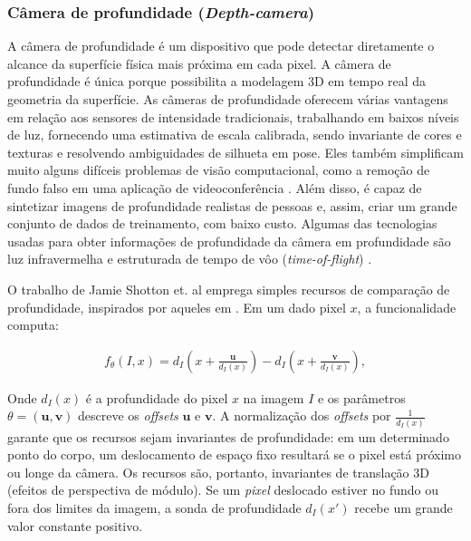  \subsubsection{Câmera de profundidade (\textit{Depth-camera})}\label{sec:depth}
A câmera de profundidade é um dispositivo que pode detectar diretamente o alcance da superfície física mais próxima em cada pixel. A câmera de profundidade é única porque possibilita a modelagem 3D em tempo real da geometria da superfície. As câmeras de profundidade oferecem várias vantagens em relação aos sensores de intensidade tradicionais, trabalhando em baixos níveis de luz, fornecendo uma estimativa de escala calibrada, sendo invariante de cores e texturas e resolvendo ambiguidades de silhueta em pose. Eles também simplificam muito alguns difíceis problemas de visão computacional, como a remoção de fundo falso em uma aplicação de videoconferência \cite{wilson2010combining}. Além disso, é capaz de sintetizar imagens de profundidade realistas de pessoas e, assim, criar um grande conjunto de dados de treinamento, com baixo custo. Algumas das tecnologias usadas para obter informações de profundidade da câmera em profundidade são luz infravermelha e estruturada de tempo de vôo (\textit{time-of-flight}) \cite{bogomjakov2006free}.

O trabalho de Jamie Shotton et. al\cite{Shotton:2013:RHP:2398356.2398381} emprega simples recursos de comparação de profundidade, inspirados por aqueles em \cite{lepetit2005randomized}. Em um dado pixel $x$, a funcionalidade computa: 

\begin{align}
{f_{\theta}}(I, x) = d_{I}  \left(x + \frac{\boldsymbol{u}}{d_{I}(x)}\right) -  d_{I} \left(x + \frac{\boldsymbol{v}}{d_{I}(x)}\right) ,
\label{eq:eq1}
\end{align}

Onde $d_{I}(x)$ é a profundidade do pixel $x$ na imagem $I$ e os parâmetros $\theta = (\boldsymbol{u,v})$ descreve os \textit{offsets} $\boldsymbol{u}$ e $\boldsymbol{v}$. A normalização dos \textit{offsets} por $\frac{1}{d_{I}(x)}$ garante que os recursos sejam invariantes de profundidade: em um determinado ponto do corpo, um deslocamento de espaço fixo resultará se o pixel está próximo ou longe da câmera. Os recursos são, portanto, invariantes de translação 3D (efeitos de perspectiva de módulo). Se um \textit{pixel} deslocado estiver no fundo ou fora dos limites da imagem, a sonda de profundidade $d_{I}(x')$ recebe um grande valor constante positivo.




